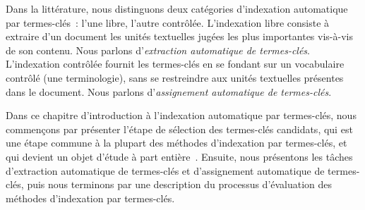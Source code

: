     Dans la littérature, nous distinguons deux catégories d'indexation
    automatique par termes-clés~: l'une libre, l'autre contrôlée. L'indexation
    libre consiste à extraire d'un document les unités textuelles
    jugées les plus importantes vis-à-vis de son contenu. Nous parlons
    d'\emph{extraction automatique de termes-clés}. L'indexation contrôlée fournit les termes-clés en se fondant sur un vocabulaire
    contrôlé (une terminologie), sans se restreindre aux unités textuelles
    présentes dans le document. Nous parlons d'\emph{assignement automatique de
    termes-clés}.

    Dans ce chapitre d'introduction à l'indexation automatique par termes-clés,
    nous commençons par présenter l'étape de sélection des termes-clés
    candidats, qui est une étape commune à la plupart des méthodes d'indexation
    par termes-clés, et qui devient un objet d'étude à part
    entière~\cite{wang2014keyphraseextractionpreprocessing}. Ensuite, nous
    présentons les tâches d'extraction automatique de termes-clés et
    d'assignement automatique de termes-clés, puis nous terminons par une
    description du processus d'évaluation des méthodes d'indexation par
    termes-clés.


